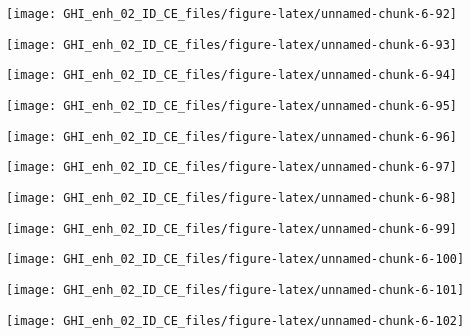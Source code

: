 \documentclass[
  10pt,
  a4paper,oneside]{article}
\begin{document}
\begin{center}\texttt{[image: GHI\_enh\_02\_ID\_CE\_files/figure-latex/unnamed-chunk-6-92]} \end{center}

\begin{center}\texttt{[image: GHI\_enh\_02\_ID\_CE\_files/figure-latex/unnamed-chunk-6-93]} \end{center}

\begin{center}\texttt{[image: GHI\_enh\_02\_ID\_CE\_files/figure-latex/unnamed-chunk-6-94]} \end{center}

\begin{center}\texttt{[image: GHI\_enh\_02\_ID\_CE\_files/figure-latex/unnamed-chunk-6-95]} \end{center}

\begin{center}\texttt{[image: GHI\_enh\_02\_ID\_CE\_files/figure-latex/unnamed-chunk-6-96]} \end{center}

\begin{center}\texttt{[image: GHI\_enh\_02\_ID\_CE\_files/figure-latex/unnamed-chunk-6-97]} \end{center}

\begin{center}\texttt{[image: GHI\_enh\_02\_ID\_CE\_files/figure-latex/unnamed-chunk-6-98]} \end{center}

\begin{center}\texttt{[image: GHI\_enh\_02\_ID\_CE\_files/figure-latex/unnamed-chunk-6-99]} \end{center}

\begin{center}\texttt{[image: GHI\_enh\_02\_ID\_CE\_files/figure-latex/unnamed-chunk-6-100]} \end{center}

\begin{center}\texttt{[image: GHI\_enh\_02\_ID\_CE\_files/figure-latex/unnamed-chunk-6-101]} \end{center}

\begin{center}\texttt{[image: GHI\_enh\_02\_ID\_CE\_files/figure-latex/unnamed-chunk-6-102]} \end{center}
\end{document}
